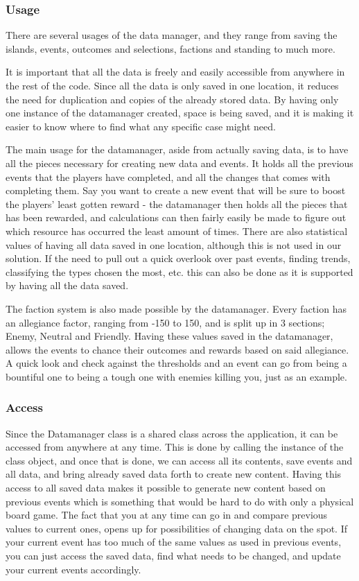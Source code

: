 \subsubsection{Usage}

There are several usages of the data manager, and they range from saving the islands, events, outcomes and selections, factions and standing to much more.

It is important that all the data is freely and easily accessible from anywhere in the rest of the code. Since all the data is only saved in one location, it reduces the need for duplication and copies of the already stored data. By having only one instance of the datamanager created, space is being saved, and it is making it easier to know where to find what any specific case might need.

The main usage for the datamanager, aside from actually saving data, is to have all the pieces necessary for creating new data and events. It holds all the previous events that the players have completed, and all the changes that comes with completing them. Say you want to create a new event that will be sure to boost the players' least gotten reward - the datamanager then holds all the pieces that has been rewarded, and calculations can then fairly easily be made to figure out which resource has occurred the least amount of times.
There are also statistical values of having all data saved in one location, although this is not used in our solution. If the need to pull out a quick overlook over past events, finding trends, classifying the types chosen the most, etc. this can also be done as it is supported by having all the data saved.

The faction system is also made possible by the datamanager. Every faction has an allegiance factor, ranging from -150 to 150, and is split up in 3 sections; Enemy, Neutral and Friendly. Having these values saved in the datamanager, allows the events to chance their outcomes and rewards based on said allegiance. A quick look and check against the thresholds and an event can go from being a bountiful one to being a tough one with enemies killing you, just as an example.

\subsubsection{Access}
Since the Datamanager class is a shared class across the application, it can be accessed from anywhere at any time. This is done by calling the instance of the class object, and once that is done, we can access all its contents, save events and all data, and bring already saved data forth to create new content. Having this access to all saved data makes it possible to generate new content based on previous events which is something that would be hard to do with only a physical board game. 
The fact that you at any time can go in and compare previous values to current ones, opens up for possibilities of changing data on the spot. If your current event has too much of the same values as used in previous events, you can just access the saved data, find what needs to be changed, and update your current events accordingly.	


